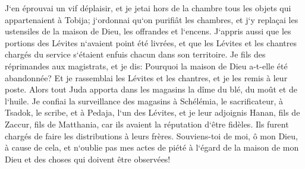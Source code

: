 \verse J`en éprouvai un vif déplaisir, et je jetai hors de la chambre tous les objets qui appartenaient à Tobija; 
\verse j`ordonnai qu`on purifiât les chambres, et j`y replaçai les ustensiles de la maison de Dieu, les offrandes et l`encens. 
\verse J`appris aussi que les portions des Lévites n`avaient point été livrées, et que les Lévites et les chantres chargés du service s`étaient enfuis chacun dans son territoire. 
\verse Je fils des réprimandes aux magistrats, et je dis: Pourquoi la maison de Dieu a-t-elle été abandonnée? Et je rassemblai les Lévites et les chantres, et je les remis à leur poste. 
\verse Alors tout Juda apporta dans les magasins la dîme du blé, du moût et de l`huile. 
\verse Je confiai la surveillance des magasins à Schélémia, le sacrificateur, à Tsadok, le scribe, et à Pedaja, l`un des Lévites, et je leur adjoignis Hanan, fils de Zaccur, fils de Matthania, car ils avaient la réputation d`être fidèles. Ils furent chargés de faire les distributions à leurs frères. 
\verse Souviens-toi de moi, ô mon Dieu, à cause de cela, et n`oublie pas mes actes de piété à l`égard de la maison de mon Dieu et des choses qui doivent être observées! 
